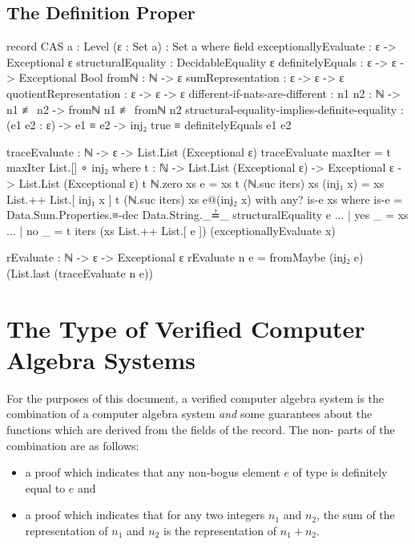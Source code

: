 \documentclass{report}
\begin{document}
\subsection{The Definition Proper}

\begin{code}
record CAS {a : Level} (ε : Set a) : Set a where
  field
    exceptionallyEvaluate : ε -> Exceptional ε
    structuralEquality : DecidableEquality ε
    definitelyEquals : ε -> ε -> Exceptional Bool
    fromℕ : ℕ -> ε
    sumRepresentation : ε -> ε -> ε
    quotientRepresentation : ε -> ε -> ε
    different-if-nats-are-different :
      {n1 n2 : ℕ} -> n1 ≢ n2 -> fromℕ n1 ≢ fromℕ n2
    structural-equality-implies-definite-equality :
      (e1 e2 : ε) ->
      e1 ≡ e2 ->
      inj₂ true ≡ definitelyEquals e1 e2

  traceEvaluate : ℕ -> ε -> List.List (Exceptional ε)
  traceEvaluate maxIter = t maxIter List.[] ∘ inj₂
    where
    t : ℕ -> List.List (Exceptional ε) -> Exceptional ε -> List.List (Exceptional ε)
    t ℕ.zero xs e = xs
    t (ℕ.suc iters) xs (inj₁ x) = xs List.++ List.[ inj₁ x ]
    t (ℕ.suc iters) xs e@(inj₂ x) with any? is-e xs
      where is-e = Data.Sum.Properties.≡-dec Data.String._≟_ structuralEquality e
    ... | yes _ = xs
    ... | no _ = t iters (xs List.++ List.[ e ]) (exceptionallyEvaluate x)

  rEvaluate : ℕ -> ε -> Exceptional ε
  rEvaluate n e = fromMaybe (inj₂ e) (List.last (traceEvaluate n e))
\end{code}

\section{The Type of Verified Computer Algebra Systems}
For the purposes of this document, a verified computer algebra system is the combination of a  computer algebra system \emph{and} some guarantees about the functions which are derived from the fields of the  record.  The non- parts of the combination are as follows:

\begin{itemize}
 \item a proof which indicates that any non-bogus element \(e\) of type  is definitely equal to \(e\) and
 \item a proof which indicates that for any two integers \(n_1\) and \(n_2\), the sum of the representation of \(n_1\) and \(n_2\) is the representation of \(n_1 + n_2\).
\end{itemize}
\end{document}
